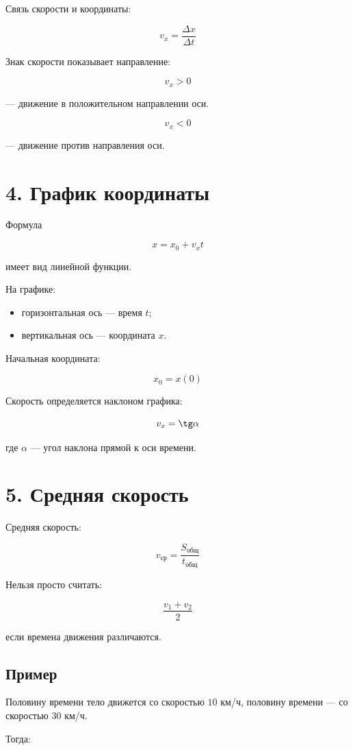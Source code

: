 \documentclass[a4paper,12pt]{article}
\begin{document}
Связь скорости и координаты:

\[
v_x=\frac{\Delta x}{\Delta t}
\]

Знак скорости показывает направление:

\[
v_x>0
\]

--- движение в положительном направлении оси.

\[
v_x<0
\]

--- движение против направления оси.

\section*{4. График координаты}

Формула

\[
x=x_0+v_xt
\]

имеет вид линейной функции.

На графике:

\begin{itemize}
\item горизонтальная ось --- время $t$;
\item вертикальная ось --- координата $x$.
\end{itemize}

Начальная координата:

\[
x_0=x(0)
\]

Скорость определяется наклоном графика:

\[
v_x=\tg\alpha
\]

где $\alpha$ --- угол наклона прямой к оси времени.

\section*{5. Средняя скорость}

Средняя скорость:

\[
v_{\text{ср}}
=
\frac{S_{\text{общ}}}{t_{\text{общ}}}
\]

Нельзя просто считать:

\[
\frac{v_1+v_2}{2}
\]

если времена движения различаются.

\subsection*{Пример}

Половину времени тело движется со скоростью $10$ км/ч, половину времени --- со скоростью $30$ км/ч.

Тогда:
\end{document}
